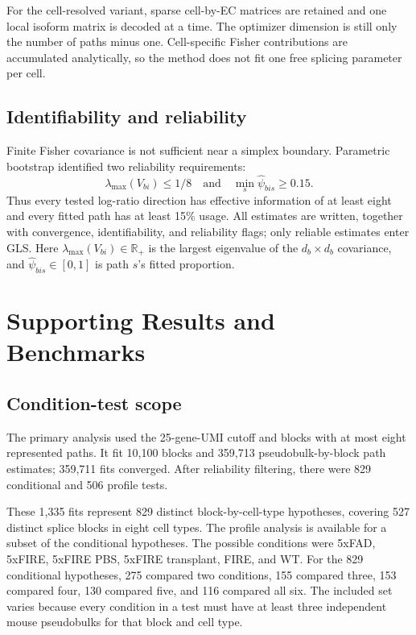\documentclass[11pt]{article}
\begin{document}
For the cell-resolved variant, sparse cell-by-EC matrices are retained and one local isoform matrix is decoded at a time. The optimizer dimension is still only the number of paths minus one. Cell-specific Fisher contributions are accumulated analytically, so the method does not fit one free splicing parameter per cell.

\subsection*{Identifiability and reliability}

Finite Fisher covariance is not sufficient near a simplex boundary. Parametric bootstrap identified two reliability requirements: \[
  \lambda_{\max}(V_{bi})\leq 1/8
  \quad\text{and}\quad
  \min_s\widehat\psi_{bis}\geq 0.15.
\]
Thus every tested log-ratio direction has effective information of at least eight and every fitted path has at least 15\% usage. All estimates are written, together with convergence, identifiability, and reliability flags; only reliable estimates enter GLS. Here \(\lambda_{\max}(V_{bi})\in\mathbb R_+\) is the largest eigenvalue of the \(d_b\times d_b\) covariance, and \(\widehat\psi_{bis}\in[0,1]\) is path \(s\)'s fitted proportion.

\section{Supporting Results and Benchmarks}

\subsection*{Condition-test scope}

The primary analysis used the 25-gene-UMI cutoff and blocks with at most eight represented paths. It fit 10,100 blocks and 359,713 pseudobulk-by-block path estimates; 359,711 fits converged. After reliability filtering, there were 829 conditional and 506 profile tests.

These 1,335 fits represent 829 distinct block-by-cell-type hypotheses, covering 527 distinct splice blocks in eight cell types. The profile analysis is available for a subset of the conditional hypotheses. The possible conditions were 5xFAD, 5xFIRE, 5xFIRE PBS, 5xFIRE transplant, FIRE, and WT. For the 829 conditional hypotheses, 275 compared two conditions, 155 compared three, 153 compared four, 130 compared five, and 116 compared all six. The included set varies because every condition in a test must have at least three independent mouse pseudobulks for that block and cell type.
\end{document}
